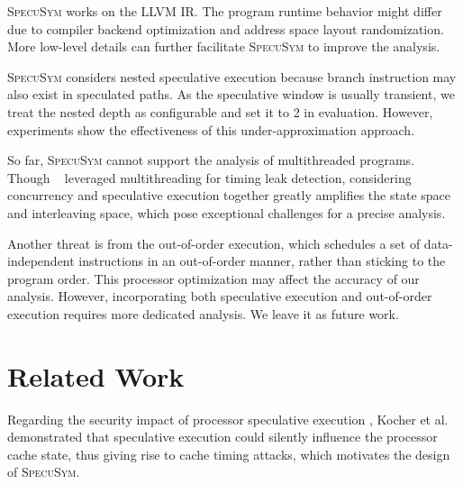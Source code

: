 \documentclass[sigconf]{acmart}
\newcommand\ignore[1]{}
\newcommand{\SpecuSym}{\textsc{SpecuSym} }
\begin{document}
\SpecuSym works on the LLVM IR. The program runtime behavior might differ due 
to compiler backend optimization and address space layout randomization. More 
low-level details can further facilitate \SpecuSym to improve the analysis.


\SpecuSym considers nested speculative execution because branch instruction 
may also exist in speculated paths. As the speculative window is usually 
transient, we treat the nested depth as configurable and set it to 2 in 
evaluation. However, experiments show the effectiveness of this 
under-approximation approach.
	

So far, \SpecuSym cannot support the analysis of multithreaded programs. Though 
{}~\cite{GuoWW18} leveraged multithreading for timing leak detection, 
considering concurrency and speculative execution together greatly amplifies 
the state space and interleaving space, which pose exceptional challenges for a 
precise analysis.


Another threat is from the out-of-order execution, which schedules a set of 
data-independent instructions in an out-of-order manner, rather than sticking 
to the program order. This processor optimization may affect the accuracy of 
our analysis. However, incorporating both speculative execution and out-of-order 
execution requires more dedicated analysis. We leave it as future work. 


\ignore{
We do not consider the situation that speculative execution leverages Branch 
Target Buffer (BTB) or Return Stack Buffer (RSB) to select the destinations 
of indirect branches. Such vulnerabilities have been effectively mitigated 
by Intel and AMD through Indirect Branch Prediction Barrier (IBPB) settings.
}

\section{Related Work}
\label{sec:related}

Regarding the security impact of processor speculative execution
\cite{kimuraKT1996}, Kocher et al.~\cite{KocherGGHHLMPSY19} demonstrated 
that speculative execution could silently influence the processor cache 
state, thus giving rise to cache timing attacks, which motivates the 
design of \textsc{SpecuSym}. 
\end{document}
